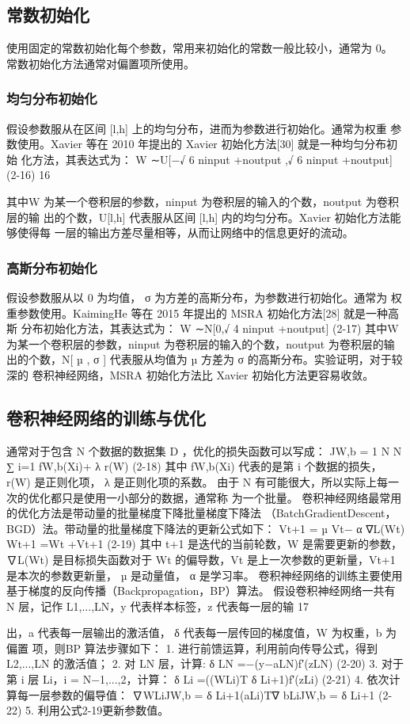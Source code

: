 \subsection{常数初始化}
使用固定的常数初始化每个参数，常用来初始化的常数一般比较小，通常为 0。 常数初始化方法通常对偏置项所使用。
\subsubsection{均匀分布初始化}
假设参数服从在区间 [l,h] 上的均匀分布，进而为参数进行初始化。通常为权重 参数使用。Xavier 等在 2010 年提出的 Xavier 初始化方法[30] 就是一种均匀分布初始 化方法，其表达式为： W ∼U[−√ 6 ninput +noutput ,√ 6 ninput +noutput] (2-16)
16

其中W 为某一个卷积层的参数，ninput 为卷积层的输入的个数，noutput 为卷积层的输 出的个数，U[l,h] 代表服从区间 [l,h] 内的均匀分布。Xavier 初始化方法能够使得每 一层的输出方差尽量相等，从而让网络中的信息更好的流动。
\subsubsection{高斯分布初始化}
假设参数服从以 0 为均值， σ
为方差的高斯分布，为参数进行初始化。通常为 权重参数使用。KaimingHe 等在 2015 年提出的 MSRA 初始化方法[28] 就是一种高斯 分布初始化方法，其表达式为： W ∼N[0,√ 4 ninput +noutput] (2-17) 其中W 为某一个卷积层的参数，ninput 为卷积层的输入的个数，noutput 为卷积层的输 出的个数，N[ µ , σ ] 代表服从均值为 µ 方差为 σ 的高斯分布。实验证明，对于较深的 卷积神经网络，MSRA 初始化方法比 Xavier 初始化方法更容易收敛。
\subsection{卷积神经网络的训练与优化}
 通常对于包含 N 个数据的数据集 D ，优化的损失函数可以写成：
JW,b =
1 N
N ∑ i=1
fW,b(Xi)+
λ r(W) (2-18)
其中 fW,b(Xi) 代表的是第 i 个数据的损失，r(W) 是正则化项， λ
是正则化项的系数。 由于 N 有可能很大，所以实际上每一次的优化都只是使用一小部分的数据，通常称 为一个批量。 卷积神经网络最常用的优化方法是带动量的批量梯度下降批量梯度下降法 （BatchGradientDescent，BGD）法。带动量的批量梯度下降法的更新公式如下： Vt+1 = µ Vt− α ∇L(Wt) Wt+1 =Wt +Vt+1 (2-19) 其中 t+1 是迭代的当前轮数，W 是需要更新的参数，∇L(Wt) 是目标损失函数对于 Wt 的偏导数，Vt 是上一次参数的更新量，Vt+1 是本次的参数更新量， µ 是动量值， α 是学习率。 卷积神经网络的训练主要使用基于梯度的反向传播（Backpropagation，BP）算法。 假设卷积神经网络一共有 N 层，记作 L1,...,LN，y 代表样本标签，z 代表每一层的输
17

出，a 代表每一层输出的激活值， δ
代表每一层传回的梯度值，W 为权重，b 为偏置
项，则BP 算法步骤如下：
1. 进行前馈运算，利用前向传导公式，得到 L2,...,LN 的激活值；
2. 对 LN 层，计算:
δ LN =−(y−aLN)f′(zLN) (2-20) 3. 对于第 i 层 Li，i = N−1,...,2，计算： δ Li =((WLi)T δ Li+1)f′(zLi) (2-21) 4. 依次计算每一层参数的偏导值： ∇WLiJW,b = δ Li+1(aLi)T∇ bLiJW,b = δ Li+1 (2-22)
5. 利用公式2-19更新参数值。

